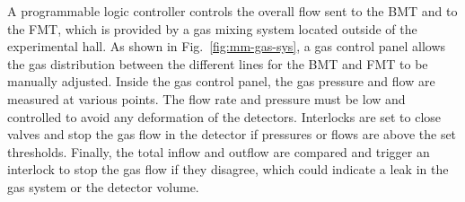 A programmable logic controller controls the overall flow sent to the BMT and to the FMT, which is provided by a gas mixing
system located outside of the experimental hall. As shown in Fig.~\ref{fig:mm-gas-sys}, a gas control panel allows the gas
distribution between the different lines for the BMT and FMT to be manually adjusted. Inside the gas control panel, the gas
pressure and flow are measured at various points. The flow rate and pressure must be low and controlled to avoid any
deformation of the detectors. Interlocks are set to close valves and stop the gas flow in the detector if pressures or flows are
above the set thresholds. Finally, the total inflow and outflow are compared and trigger an interlock to stop the gas flow if they
disagree, which could indicate a leak in the gas system or the detector volume. 

